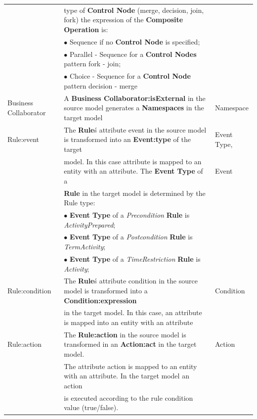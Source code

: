 \begin{table}[ht!]
\begin{tabular}{l|l|l}
    & type of \textbf{Control Node} (merge, decision, join, fork)
    the expression of the \textbf{Composite Operation} is: & \\

    &  $\bullet$ Sequence if no \textbf{Control Node} is specified;  & \\
    &  $\bullet$ Parallel - Sequence for  a \textbf{Control Nodes} pattern fork -
    join; & \\ &
    $\bullet$ Choice - Sequence for a \textbf{Control Node} pattern decision -
    merge &
    \\

    \hline

    Business Collaborator   & A \textbf{Business Collaborator:isExternal} in the
    source model generates a \textbf{Namespaces} in the target model  &
    Namespace\\
    \hline

    Rule:event   &  The \textbf{Rule}\'s attribute event in the source model is
    transformed into an \textbf{Event:type} of the target  & Event Type,\\
    & model. In this case attribute is mapped to an
entity with an attribute. The \textbf{Event Type} of a & Event\\
  & \textbf{Rule} in the target model is
determined by the Rule type: & \\
     &  $\bullet$ \textbf{Event Type} of a \textit{Precondition} \textbf{Rule} is
     \textit{ActivityPrepared}; & \\
     &  $\bullet$ \textbf{Event Type} of a \textit{Postcondition} \textbf{Rule}
     is \textit{TermActivity}; & \\
    &  $\bullet$ \textbf{Event Type} of a \textit{TimeRestriction} \textbf{Rule}
     is \textit{Activity}; & \\
    \hline

    Rule:condition   &  The \textbf{Rule}\'s attribute condition in the source
    model is transformed into a \textbf{Condition:expression}  & Condition\\
    &  in the target model.  In this case, an attribute is
mapped into an entity with an attribute  & \\
    \hline

    Rule:action   & The \textbf{Rule:action} in the source model is
    transformed in an \textbf{Action:act} in the target model.  & Action\\
    & The attribute action is mapped to an entity with an attribute. In the
    target model an action & \\
    & is executed according to the rule condition value (true/false). & \\


\end{tabular}
\end{table}
